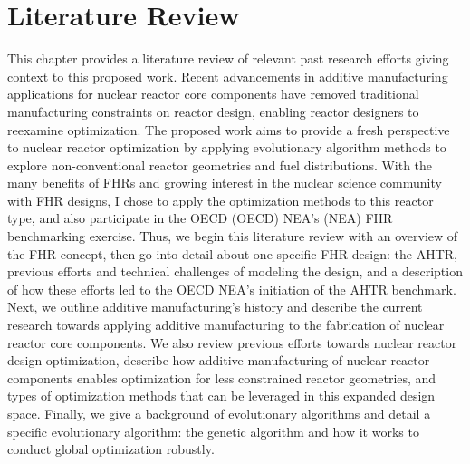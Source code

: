 \chapter{Literature Review}
\label{chap:lit-review}

This chapter provides a literature review of relevant past research efforts 
giving context to this proposed work.
Recent advancements in additive manufacturing applications for nuclear reactor core 
components have removed traditional manufacturing constraints on reactor design, 
enabling reactor designers to reexamine optimization.
The proposed work aims to provide a fresh perspective to nuclear reactor optimization
by applying evolutionary algorithm methods to explore non-conventional reactor 
geometries and fuel distributions. 
With the many benefits of \glspl{FHR} and growing interest in the nuclear science 
community with \gls{FHR} designs, I chose to apply the optimization methods to 
this reactor type, and also participate in the \acrlong{OECD} (OECD) 
\acrlong{NEA}'s (NEA) \gls{FHR} benchmarking exercise. 
Thus, we begin this literature review with an overview of the \gls{FHR} concept, 
then go into detail about one specific \gls{FHR} design: the \gls{AHTR}, 
previous efforts and technical challenges of modeling the design, and a 
description of how these efforts led to the \gls{OECD} \gls{NEA}'s initiation of 
the \gls{AHTR} benchmark.
Next, we outline additive manufacturing's history and describe the current research towards applying 
additive manufacturing to the fabrication of nuclear reactor core components. 
We also review previous efforts towards nuclear reactor design optimization, 
describe how additive manufacturing of nuclear reactor components enables optimization for 
less constrained reactor geometries, and types of optimization methods that can be 
leveraged in this expanded design space.   
Finally, we give a background of evolutionary algorithms and detail a specific 
evolutionary algorithm: the genetic algorithm and how it works to conduct global 
optimization robustly.

